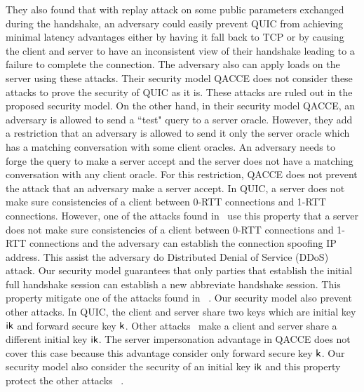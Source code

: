 They also found that with replay attack on some
public parameters exchanged during the handshake, an
adversary could easily prevent QUIC from achieving
minimal latency advantages either by having it fall back
to TCP or by causing the client and server to have an
inconsistent view of their handshake leading to a failure
to complete the connection.
The adversary also can apply loads on the server using
these attacks.
Their security model QACCE does not consider these attacks
to prove the security of QUIC as it is.
These attacks are ruled out in the proposed security model.
On the other hand, in their security model QACCE, an adversary
is allowed to send a ``test" query to a server oracle.
However, they add a restriction that an adversary is allowed
to send it only the server oracle which has a matching
conversation with some client oracles.
An adversary needs to forge the query to make a server accept
and the server does not have a matching conversation with any
client oracle.
For this restriction, QACCE does not prevent the attack that
an adversary make a server accept.
In QUIC, a server does not make sure consistencies of a client
between 0-RTT connections and 1-RTT connections.
However, one of the attacks found in~\cite{LJBN15:QUIC} use this
property that a server does not make sure consistencies of a client
between 0-RTT connections and 1-RTT connections and the adversary
can establish the connection spoofing IP address.
This assist the adversary do Distributed Denial of Service
(DDoS) attack.
Our security model guarantees that only parties
that establish the initial full handshake session can
establish a new abbreviate handshake session.
This property mitigate one of the attacks found in
~\cite{LJBN15:QUIC}.
Our security model also prevent other attacks.
In QUIC, the client and server share two keys which are initial
key $\mathsf{ik}$ and forward secure key $\mathsf{k}$.
Other attacks~\cite{LJBN15:QUIC} make a client and server share
a different initial key $\mathsf{ik}$.
The server impersonation advantage in QACCE does not
cover this case because this advantage consider only forward
secure key $\mathsf{k}$.
Our security model also consider the security of an initial
key $\mathsf{ik}$ and this property protect the other attacks
~\cite{LJBN15:QUIC}.

